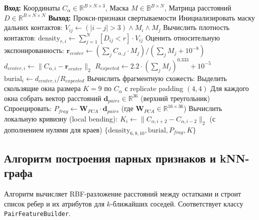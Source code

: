 \documentclass[12pt, a4paper]{article}
\begin{document}
\begin{algorithm}[h]
\caption{Извлечение признаков свертываемости}
\label{alg:foldability}
\begin{algorithmic}[1]
\Statex \textbf{Вход:} Координаты $C_\alpha \in \mathbb{R}^{B \times N \times 3}$, Маска $M \in \mathbb{B}^{B \times N}$, Матрица расстояний $D \in \mathbb{R}^{B \times N \times N}$
\Statex \textbf{Выход:} Прокси-признаки свертываемости
\State Инициализировать маску дальних контактов: $V_{ij} \gets (|i - j| > 3) \land M_i \land M_j$
\State Вычислить плотность контактов:
    \State $\text{density}_{r, i} \gets \sum_{j=1}^N [D_{ij} < r] \cdot V_{ij}$
\EndFor
\State Оценить относительную экспонированность:
\State \quad $\mathbf{r}_{center} \gets \left(\sum_j C_{\alpha, j} \cdot M_j\right) / \left(\sum_j M_j + 10^{-8}\right)$
\State \quad $d_{center, i} \gets \|C_{\alpha, i} - \mathbf{r}_{center}\|_2$
\State \quad $R_{expected} \gets 2.2 \cdot \left(\sum_j M_j\right)^{0.333} + 10^{-5}$
\State \quad $\text{burial}_i \gets d_{center, i} / R_{expected}$
\State Вычислить фрагментную схожесть:
\State \quad Выделить скользящие окна размера $K=9$ по $C_\alpha$ с replicate padding $(4, 4)$
\State \quad Для каждого окна собрать вектор расстояний $\mathbf{d}_{pairs} \in \mathbb{R}^{36}$ (верхний треугольник)
\State \quad Спроецировать: $P_{frag} \gets \mathbf{W}_{PCA} \cdot \mathbf{d}_{pairs}$ (где $\mathbf{W}_{PCA} \in \mathbb{R}^{16 \times 36}$)
\State Вычислить локальную кривизну (local bending):
\State \quad $K_i \gets \|C_{\alpha, i+2} - C_{\alpha, i-2}\|_2$ (с дополнением нулями для краев)
\State \Return $\{\text{density}_{6,8,10}, \text{burial}, P_{frag}, K\}$
\end{algorithmic}
\end{algorithm}

\newpage

\subsection{Алгоритм построения парных признаков и kNN-графа}
Алгоритм вычисляет RBF-разложение расстояний между остатками и строит список ребер и их атрибутов для $k$-ближайших соседей. Соответствует классу \texttt{Pair}\-\texttt{Feature}\-\texttt{Builder}.
\end{document}
